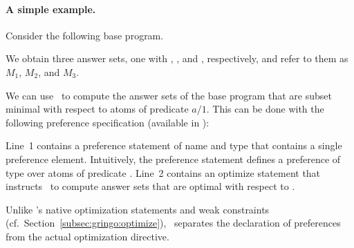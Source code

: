 \paragraph{A simple example.} 
\begin{example}
Consider the following base program.
%

%
We obtain three answer sets, one with , , and , respectively,
and refer to them as $M_1$, $M_2$, and $M_3$.

We can use \asprin\ to compute the answer sets of the base program that are subset minimal with respect to atoms of predicate $a/1$. 
This can be done with the following preference specification 
(available in ): 
%

%
Line~1 contains a preference statement of name  and type  that contains a single preference element.
Intuitively, the preference statement  defines a preference of type  over atoms of predicate . 
Line~2 contains an optimize statement that instructs \asprin\ to compute answer sets that are optimal with respect to . 

\begin{note}
Unlike \gringo's native optimization statements and weak constraints (cf.\ Section~\ref{subsec:gringo:optimize}),
\asprin\ separates the declaration of preferences from the actual optimization directive.
\end{note}


\end{example}
